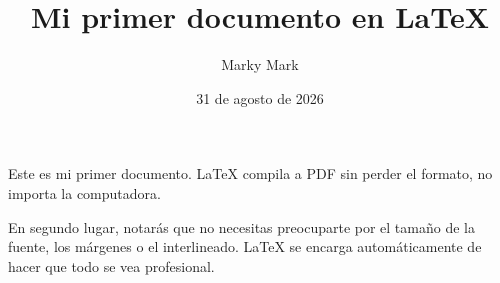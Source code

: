 \documentclass[12pt, a4paper]{article}
\title{Mi primer documento en \LaTeX{}}
\author{Marky Mark}
\date{31 de agosto de 2026}
\begin{document}
\maketitle

Este es mi primer documento. \LaTeX{} compila a PDF sin perder el formato, 
no importa la computadora.

En segundo lugar, notarás que no necesitas preocuparte por el tamaño de la 
fuente, los márgenes o el interlineado. \LaTeX{} se encarga automáticamente 
de hacer que todo se vea profesional.
\end{document}
